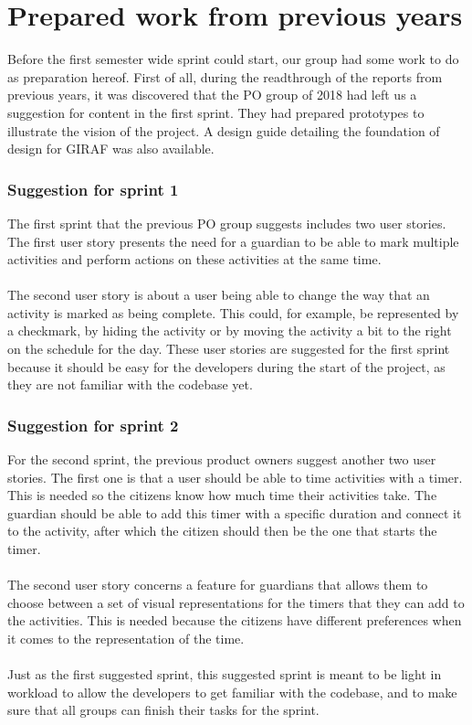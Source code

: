 \section{Prepared work from previous years}\label{prepared-work-from-previous-years}
Before the first semester wide sprint could start, our group had some work to do as preparation hereof.
First of all, during the readthrough of the reports from previous years, it was discovered that the PO group of 2018 had left us a suggestion for content in the first sprint.
They had prepared prototypes to illustrate the vision of the project.
A design guide detailing the foundation of design for GIRAF was also available. 

\subsubsection{Suggestion for sprint 1}
The first sprint that the previous PO group suggests includes two user stories.
The first user story presents the need for a guardian to be able to mark multiple activities and perform actions on these activities at the same time.
\\\\
The second user story is about a user being able to change the way that an activity is marked as being complete.
This could, for example, be represented by a checkmark, by hiding the activity or by moving the activity a bit to the right on the schedule for the day.
These user stories are suggested for the first sprint because it should be easy for the developers during the start of the project, as they are not familiar with the codebase yet.

\subsubsection{Suggestion for sprint 2}
For the second sprint, the previous product owners suggest another two user stories.
The first one is that a user should be able to time activities with a timer.
This is needed so the citizens know how much time their activities take.
The guardian should be able to add this timer with a specific duration and connect it to the activity, after which the citizen should then be the one that starts the timer.
\\\\
The second user story concerns a feature for guardians that allows them to choose between a set of visual representations for the timers that they can add to the activities.
This is needed because the citizens have different preferences when it comes to the representation of the time.
\\\\
Just as the first suggested sprint, this suggested sprint is meant to be light in workload to allow the developers to get familiar with the codebase, and to make sure that all groups can finish their tasks for the sprint.


